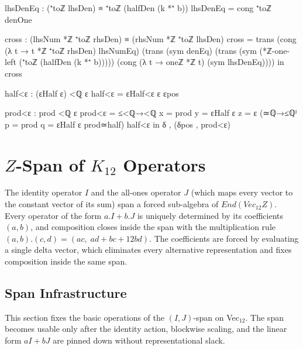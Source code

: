 \documentclass[11pt,a4paper]{book}
\def\cdot{.}%
\def\mathrm#1{#1}%
\def\mathbb#1{#1}%
\begin{document}
\begin{code}
        lhsDenEq : (⁺toℤ lhsDen) ≡ ⁺toℤ (halfDen (k *⁺ b))
        lhsDenEq = cong ⁺toℤ denOne

        cross : (lhsNum *ℤ ⁺toℤ rhsDen) ≡ (rhsNum *ℤ ⁺toℤ lhsDen)
        cross =
          trans
            (cong (λ t → t *ℤ ⁺toℤ rhsDen) lhsNumEq)
            (trans
              (sym denEq)
              (trans
                (sym (*ℤ-one-left (⁺toℤ (halfDen (k *⁺ b)))))
                (cong (λ t → oneℤ *ℤ t) (sym lhsDenEq))))
      in
      cross

    half<ε : (εHalf ε) <ℚ ε
    half<ε = εHalf<ε ε εpos

    prod<ε : prod <ℚ ε
    prod<ε =
      ≤<ℚ→<ℚ
        {x = prod} {y = εHalf ε} {z = ε}
        (≃ℚ→≤ℚˡ {p = prod} {q = εHalf ε} prod≃half)
        half<ε
  in
  δ , (δpos , prod<ε)
\end{code}


\chapter{$\mathbb{Z}$-Span of $K_{12}$ Operators}
\label{ch:z-span-k12}

The identity operator $I$ and the all-ones operator $J$ (which maps
every vector to the constant vector of its sum) span a forced
sub-algebra of $\mathrm{End}(\mathrm{Vec}_{12}\mathbb{Z})$. Every
operator of the form $a \cdot I + b \cdot J$ is uniquely determined by
its coefficients $(a,b)$, and composition closes inside the span with
the multiplication rule
$(a,b) \cdot (c,d) = (ac,\; ad + bc + 12bd)$.
The coefficients are forced by evaluating a single delta vector, which
eliminates every alternative representation and fixes composition inside the
same span.

\section{Span Infrastructure}

This section fixes the basic operations of the $(I,J)$-span on Vec$_{12}$.
The span becomes usable only after the identity action, blockwise scaling, and
the linear form $aI+bJ$ are pinned down without representational slack.
\end{document}
